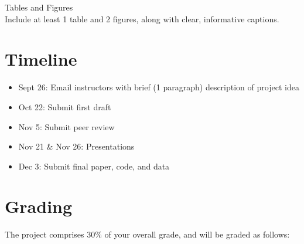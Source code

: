 \documentclass[12pt]{article}
\begin{document}
Tables and Figures \\
Include at least 1 table and 2 figures, along with
clear, informative captions. 


\section*{Timeline}

\begin{itemize}
  \item Sept 26: Email instructors with brief (1 paragraph) description
    of project idea
  \item Oct 22: Submit first draft
  \item Nov 5: Submit peer review
  \item Nov 21 \& Nov 26: Presentations
  \item Dec 3: Submit final paper, code, and data
\end{itemize}


\section*{Grading}

The project comprises 30\% of your overall grade, and will be graded as follows:
\end{document}
